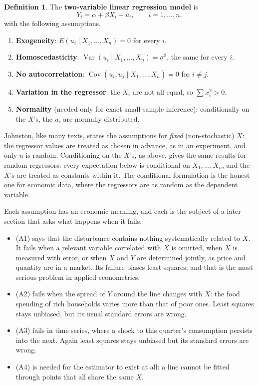 \documentclass[11pt,a4paper]{article}
\numberwithin{equation}{section}
\DeclareMathOperator{\Var}{Var}
\DeclareMathOperator{\Cov}{Cov}
\theoremstyle{definition}
\newtheorem{defn}[thm]{Definition}
\begin{document}
\begin{defn}
\label{def:clrm2}
The \textbf{two-variable linear regression model} is
\[
Y_i = \alpha + \beta X_i + u_i , \qquad i = 1, \dots, n ,
\]
with the following assumptions.
\begin{enumerate}[label=(A\arabic*)]
\item \textbf{Exogeneity}: $E(u_i \mid X_1, \dots, X_n) = 0$ for every $i$.
\item \textbf{Homoscedasticity}: $\Var(u_i \mid X_1, \dots, X_n) = \sigma^2$, the same for every $i$.
\item \textbf{No autocorrelation}: $\Cov(u_i, u_j \mid X_1, \dots, X_n) = 0$ for $i \neq j$.
\item \textbf{Variation in the regressor}: the $X_i$ are not all equal, so $\sum x_i^2 > 0$.
\item \textbf{Normality} (needed only for exact small-sample inference): conditionally on the $X$'s, the $u_i$ are normally distributed.
\end{enumerate}
\end{defn}

Johnston, like many texts, states the assumptions for \emph{fixed} (non-stochastic) $X$: the regressor values are treated as chosen in advance,
as in an experiment, and only $u$ is random. Conditioning on the $X$'s, as above, gives the same results for random regressors: every expectation
below is conditional on $X_1, \dots, X_n$, and the $X$'s are treated as constants within it. The conditional formulation is the honest one for
economic data, where the regressors are as random as the dependent variable.

Each assumption has an economic meaning, and each is the subject of a later section that asks what happens when it fails.
\begin{itemize}
\item (A1) says that the disturbance contains nothing systematically related to $X$. It fails when a relevant variable correlated with $X$ is
omitted, when $X$ is measured with error, or when $X$ and $Y$ are determined jointly, as price and quantity are in a market. Its failure biases
least squares, and that is the most serious problem in applied econometrics.
\item (A2) fails when the spread of $Y$ around the line changes with $X$: the food spending of rich households varies more than that of poor
ones. Least squares stays unbiased, but its usual standard errors are wrong.
\item (A3) fails in time series, where a shock to this quarter's consumption persists into the next. Again least squares stays unbiased but its
standard errors are wrong.
\item (A4) is needed for the estimator to exist at all: a line cannot be fitted through points that all share the same $X$.
\end{itemize}
\end{document}
